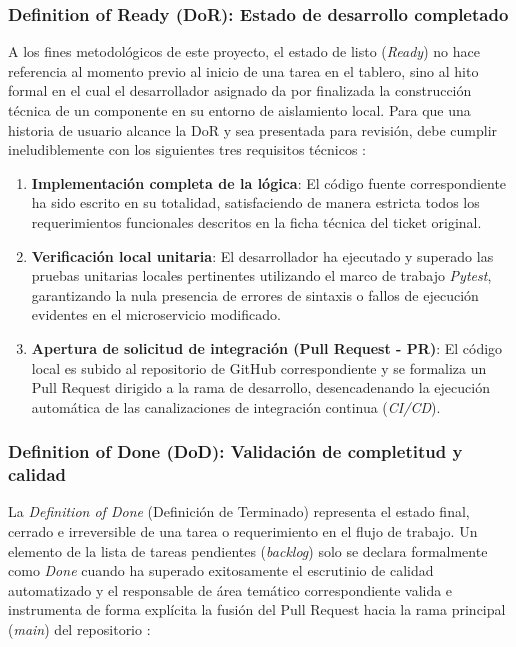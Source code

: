 \documentclass[conference, a4paper]{IEEEtran}
\begin{document}
\subsubsection{Definition of Ready (DoR): Estado de desarrollo completado}
A los fines metodol\'ogicos de este proyecto, el estado de listo (\textit{Ready}) no hace referencia al momento previo al inicio de una tarea en el tablero, sino al hito formal en el cual el desarrollador asignado da por finalizada la construcci\'on t\'ecnica de un componente en su entorno de aislamiento local. Para que una historia de usuario alcance la DoR y sea presentada para revisi\'on, debe cumplir ineludiblemente con los siguientes tres requisitos t\'ecnicos :

\begin{enumerate}
    \item \textbf{Implementaci\'on completa de la l\'ogica}: El c\'odigo fuente correspondiente ha sido escrito en su totalidad, satisfaciendo de manera estricta todos los requerimientos funcionales descritos en la ficha t\'ecnica del ticket original.
    \item \textbf{Verificaci\'on local unitaria}: El desarrollador ha ejecutado y superado las pruebas unitarias locales pertinentes utilizando el marco de trabajo \textit{Pytest}, garantizando la nula presencia de errores de sintaxis o fallos de ejecuci\'on evidentes en el microservicio modificado.
    \item \textbf{Apertura de solicitud de integraci\'on (Pull Request - PR)}: El c\'odigo local es subido al repositorio de GitHub correspondiente y se formaliza un Pull Request dirigido a la rama de desarrollo, desencadenando la ejecuci\'on autom\'atica de las canalizaciones de integraci\'on continua (\textit{CI/CD}).
\end{enumerate}

\subsubsection{Definition of Done (DoD): Validaci\'on de completitud y calidad}
La \textit{Definition of Done} (Definici\'on de Terminado) representa el estado final, cerrado e irreversible de una tarea o requerimiento en el flujo de trabajo. Un elemento de la lista de tareas pendientes (\textit{backlog}) solo se declara formalmente como \textit{Done} cuando ha superado exitosamente el escrutinio de calidad automatizado y el responsable de \'area tem\'atico correspondiente valida e instrumenta de forma expl\'icita la fusi\'on del Pull Request hacia la rama principal (\textit{main}) del repositorio :
\end{document}
